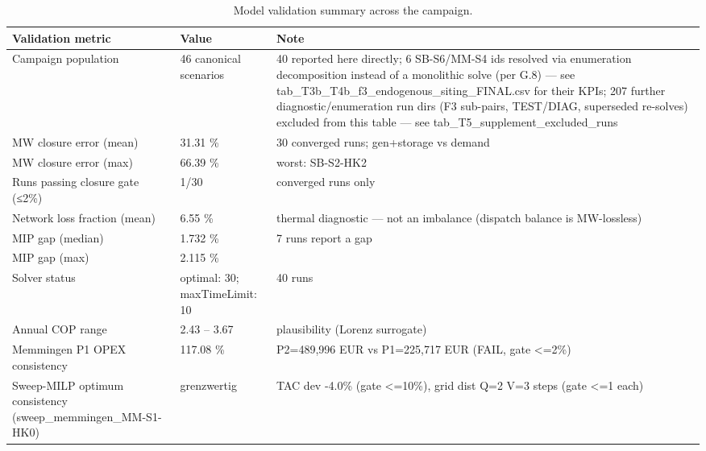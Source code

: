 \begin{table}[htbp]
  \centering
  \caption{Model validation summary across the campaign.}
  \label{tab:t5_validation}
  \begin{tabular}{lll}
  \toprule
  Validation metric & Value & Note \\
  \midrule
  Campaign population & 46 canonical scenarios & 40 reported here directly; 6 SB-S6/MM-S4 ids resolved via enumeration decomposition instead of a monolithic solve (per G.8) — see tab\_T3b\_T4b\_f3\_endogenous\_siting\_FINAL.csv for their KPIs; 207 further diagnostic/enumeration run dirs (F3 sub-pairs, TEST/DIAG, superseded re-solves) excluded from this table — see tab\_T5\_supplement\_excluded\_runs \\
  MW closure error (mean) & 31.31 \% & 30 converged runs; gen+storage vs demand \\
  MW closure error (max) & 66.39 \% & worst: SB-S2-HK2 \\
  Runs passing closure gate (≤2\%) & 1/30 & converged runs only \\
  Network loss fraction (mean) & 6.55 \% & thermal diagnostic — not an imbalance (dispatch balance is MW-lossless) \\
  MIP gap (median) & 1.732 \% & 7 runs report a gap \\
  MIP gap (max) & 2.115 \% &  \\
  Solver status & optimal: 30; maxTimeLimit: 10 & 40 runs \\
  Annual COP range & 2.43 -- 3.67 & plausibility (Lorenz surrogate) \\
  Memmingen P1 OPEX consistency & 117.08 \% & P2=489,996 EUR vs P1=225,717 EUR (FAIL, gate <=2\%) \\
  Sweep-MILP optimum consistency (sweep\_memmingen\_MM-S1-HK0) & grenzwertig & TAC dev -4.0\% (gate <=10\%), grid dist Q=2 V=3 steps (gate <=1 each) \\
  \bottomrule
  \end{tabular}
\end{table}

